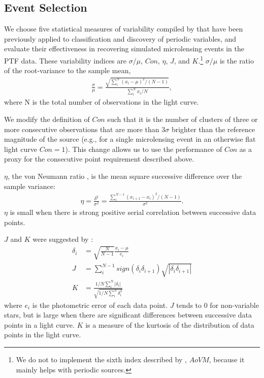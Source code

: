 \documentclass[iop]{emulateapj}
\begin{document}
\subsection{Event Selection} \label{sec:event_selection}
We choose five statistical measures of variability compiled by \cite{shin2009} that have been previously applied to classification and discovery of periodic variables, and evaluate their effectiveness in recovering simulated microlensing events in the PTF data. These variability indices are $\sigma/\mu$, $Con$, $\eta$, $J$, and $K$.\footnote{We do not to implement the sixth index described by \cite{shin2009}, $AoVM$, because it mainly helps with periodic sources.} $\sigma/\mu$ is the ratio of the root-variance to the sample mean, 
\begin{align}
	\frac{\sigma}{\mu} = \frac{\sqrt{\sum^N_i (x_i - \mu)^2 / (N-1)}}{\sum^N_i x_i/N},
\end{align}
where N is the total number of observations in the light curve. 

We modify the definition of $Con$ such that it is the number of clusters of three or more consecutive observations that are more than $3\sigma$ brighter than the reference magnitude of the source (e.g., for a single microlensing event in an otherwise flat light curve $Con=1$). This change allows us to use the performance of $Con$ as a proxy for the consecutive point requirement described above. 

$\eta$, the von Neumann ratio \citep{von_neumann1941}, is the mean square successive difference over the sample variance:
\begin{align}
	\eta = \frac{\delta^2}{\sigma^2} = \frac{\sum^{N-1}_i(x_{i+1} - x_i)^2/(N-1)}{\sigma^2}.
\end{align}
$\eta$ is small when there is strong positive serial correlation between successive data points. 

$J$ and $K$ were suggested by \cite{stetson1996}:
\begin{align}
	\delta_i &= \sqrt{\frac{N}{N-1}}\frac{x_i-\mu}{e_i}\\
	J &= \sum^{N-1}_i sign(\delta_i \delta_{i+1})\sqrt{|\delta_i \delta_{i+1}|}\\
	K &= \frac{1/N\sum^N_i |\delta_i|}{\sqrt{1/N\sum^N_i\delta_i^2}}
\end{align}
where $e_i$ is the photometric error of each data point. $J$ tends to 0 for non-variable stars, but is large when there are significant differences between successive data points in a light curve. $K$ is a measure of the kurtosis of the distribution of data points in the light curve.
\end{document}
